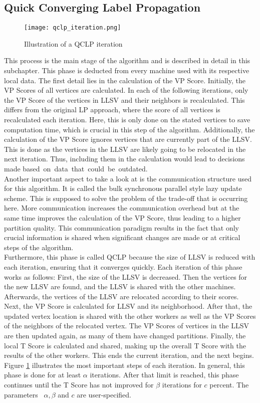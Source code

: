 \documentclass[acmsmall,nonacm,screen,review]{acmart}
\begin{document}
\subsection{Quick Converging Label Propagation}
\begin{figure}[b]
\centering
\caption{Illustration of a QCLP iteration}
\label{iteration}
\texttt{[image: qclp\_iteration.png]}
\end{figure}
This process is the main stage of the algorithm and is described in detail in this subchapter. This phase is deducted from every machine used with its respective local data. The first detail lies in the calculation of the VP Score. Initially, the VP Scores of all vertices are calculated. In each of the following iterations, only the VP Score of the vertices in LLSV and their neighbors is recalculated. This differs from the original LP approach, where the score of all vertices is recalculated each iteration. Here, this is only done on the stated vertices to save computation time, which is crucial in this step of the algorithm. Additionally, the calculation of the VP Score ignores vertices that are currently part of the LLSV. This is done as the vertices in the LLSV are likely going to be relocated in the next iteration. Thus, including them in the calculation would lead to decisions made \hbox{based on data that could be outdated.} 
\\
Another important aspect to take a look at is the communication structure used for this algorithm. It is called the bulk synchronous parallel style \cite{BSP} lazy update scheme. This is supposed to solve the problem of the trade-off that is occurring here. More communication increases the communication overhead but at the same time improves the calculation of the VP Score, thus leading to a higher partition quality. This communication paradigm  results in the fact that only crucial information is shared when significant changes are made or at critical steps of the algorithm. \\
Furthermore, this phase is called QCLP because the size of LLSV is reduced with each iteration, ensuring that it converges quickly. Each iteration of this phase works as follows: First, the size of the LLSV is decreased. Then the vertices for the new LLSV are found, and the LLSV is shared with the other machines. Afterwards, the vertices of the LLSV are relocated according to their scores. Next, the VP Score is calculated for LLSV and its neighborhood. After that, the updated vertex location is shared with the other workers as well as the VP Scores of the neighbors of the relocated vertex. The VP Scores of vertices in the LLSV are then updated again, as many of them have changed partitions. Finally, the local T Score is calculated and shared, making up the overall T Score with the results of the other workers. This ends the current iteration, and the next begins. Figure \ref{iteration} illustrates the most important steps of each iteration. In general, this phase is done for at least $\alpha$ iterations. After that limit is reached, this phase continues until the T Score has not improved for $\beta$ iterations for $c$ percent. The parameters ~$\alpha,\beta$ and $c$ are user-specified. \\
\end{document}
